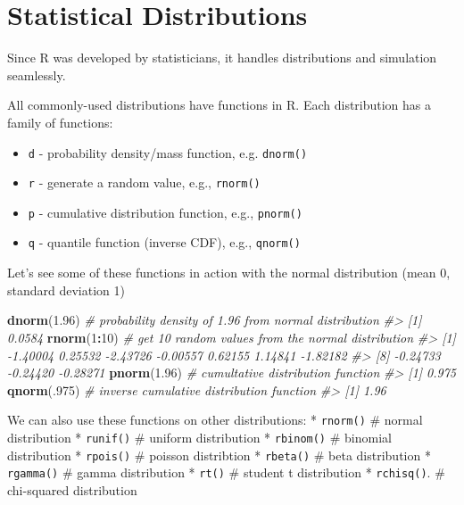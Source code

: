 \documentclass[]{book}
\newenvironment{Shaded}{\begin{snugshade}}{\end{snugshade}}
\newcommand{\KeywordTok}[1]{\textcolor[rgb]{0.13,0.29,0.53}{\textbf{#1}}}
\newcommand{\DecValTok}[1]{\textcolor[rgb]{0.00,0.00,0.81}{#1}}
\newcommand{\FloatTok}[1]{\textcolor[rgb]{0.00,0.00,0.81}{#1}}
\newcommand{\CommentTok}[1]{\textcolor[rgb]{0.56,0.35,0.01}{\textit{#1}}}
\newcommand{\OperatorTok}[1]{\textcolor[rgb]{0.81,0.36,0.00}{\textbf{#1}}}
\newcommand{\NormalTok}[1]{#1}
\providecommand{\tightlist}{%
  \setlength{\itemsep}{0pt}\setlength{\parskip}{0pt}}
\begin{document}
\section{Statistical Distributions}\label{statistical-distributions}

Since R was developed by statisticians, it handles distributions and
simulation seamlessly.

All commonly-used distributions have functions in R. Each distribution
has a family of functions:

\begin{itemize}
\tightlist
\item
  \texttt{d} - probability density/mass function, e.g. \texttt{dnorm()}
\item
  \texttt{r} - generate a random value, e.g., \texttt{rnorm()}
\item
  \texttt{p} - cumulative distribution function, e.g., \texttt{pnorm()}
\item
  \texttt{q} - quantile function (inverse CDF), e.g., \texttt{qnorm()}
\end{itemize}

Let's see some of these functions in action with the normal distribution
(mean 0, standard deviation 1)

\begin{Shaded}
\begin{Highlighting}[]
\KeywordTok{dnorm}\NormalTok{(}\FloatTok{1.96}\NormalTok{) }\CommentTok{# probability density of 1.96 from normal distribution}
\CommentTok{#> [1] 0.0584}
\KeywordTok{rnorm}\NormalTok{(}\DecValTok{1}\OperatorTok{:}\DecValTok{10}\NormalTok{) }\CommentTok{# get 10 random values from the normal distribution}
\CommentTok{#>  [1] -1.40004  0.25532 -2.43726 -0.00557  0.62155  1.14841 -1.82182}
\CommentTok{#>  [8] -0.24733 -0.24420 -0.28271}
\KeywordTok{pnorm}\NormalTok{(}\FloatTok{1.96}\NormalTok{) }\CommentTok{# cumultative distribution function}
\CommentTok{#> [1] 0.975}
\KeywordTok{qnorm}\NormalTok{(.}\DecValTok{975}\NormalTok{) }\CommentTok{# inverse cumulative distribution function}
\CommentTok{#> [1] 1.96}
\end{Highlighting}
\end{Shaded}

We can also use these functions on other distributions: *
\texttt{rnorm()} \# normal distribution * \texttt{runif()} \# uniform
distribution * \texttt{rbinom()} \# binomial distribution *
\texttt{rpois()} \# poisson distribtion * \texttt{rbeta()} \# beta
distribution * \texttt{rgamma()} \# gamma distribution * \texttt{rt()}
\# student t distribution * \texttt{rchisq()}. \# chi-squared
distribution
\end{document}
